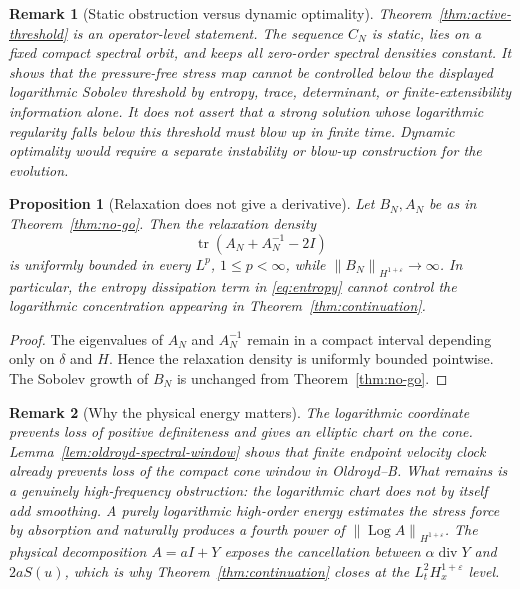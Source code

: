 \documentclass[11pt]{article}
\newtheorem{proposition}{Proposition}[section]
\newtheorem{remark}{Remark}[section]
\newcommand{\Id}{I}
\newcommand{\tr}{\operatorname{tr}}
\newcommand{\divv}{\operatorname{div}}
\newcommand{\Log}{\operatorname{Log}}
\newcommand{\eps}{\varepsilon}
\newcommand{\norm}[1]{\left\lVert #1\right\rVert}
\begin{document}
\begin{remark}[Static obstruction versus dynamic optimality]
Theorem~\ref{thm:active-threshold} is an operator-level statement.  The
sequence \(C_N\) is static, lies on a fixed compact spectral orbit, and keeps
all zero-order spectral densities constant.  It shows that the pressure-free
stress map cannot be controlled below the displayed logarithmic Sobolev
threshold by entropy, trace, determinant, or finite-extensibility information
alone.  It does not assert that a strong solution whose logarithmic regularity
falls below this threshold must blow up in finite time.  Dynamic optimality would
require a separate instability or blow-up construction for the evolution.
\end{remark}

\begin{proposition}[Relaxation does not give a derivative]
\label{prop:relax-no-derivative}
Let \(B_N,A_N\) be as in Theorem~\ref{thm:no-go}.  Then the relaxation
density
\[
  \tr(A_N+A_N^{-1}-2\Id)
\]
is uniformly bounded in every \(L^p\), \(1\le p<\infty\), while
\(\norm{B_N}_{H^{1+\eps}}\to\infty\).  In particular, the entropy dissipation
term in \eqref{eq:entropy} cannot control the logarithmic concentration
appearing in Theorem~\ref{thm:continuation}.
\end{proposition}

\begin{proof}
The eigenvalues of \(A_N\) and \(A_N^{-1}\) remain in a compact interval
depending only on \(\delta\) and \(H\).  Hence the relaxation density is
uniformly bounded pointwise.  The Sobolev growth of \(B_N\) is unchanged from
Theorem~\ref{thm:no-go}.
\end{proof}

\begin{remark}[Why the physical energy matters]
The logarithmic coordinate prevents loss of positive definiteness and gives an
elliptic chart on the cone.  Lemma~\ref{lem:oldroyd-spectral-window} shows that
finite endpoint velocity clock already prevents loss of the compact cone window
in Oldroyd--B.  What remains is a genuinely high-frequency obstruction: the
logarithmic chart does not by itself add smoothing.  A purely
logarithmic high-order energy estimates the stress force by absorption and
naturally produces a fourth power of \(\norm{\Log A}_{H^{1+\eps}}\).  The
physical decomposition \(A=aI+Y\) exposes the cancellation between
\(\alpha\divv Y\) and \(2aS(u)\), which is why Theorem~\ref{thm:continuation}
closes at the \(L^2_tH^{1+\eps}_x\) level.
\end{remark}
\end{document}
